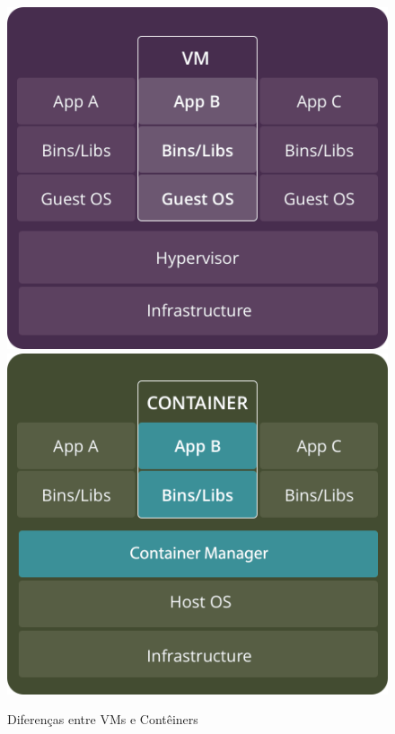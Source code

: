 \documentclass[]{politex}
\begin{document}
	\begin{figure}[htb]
		\caption{\label{fig_circulo}Diferenças entre VMs e Contêiners}
		\begin{center}
		\includegraphics[scale=0.20]{vms.png}
		\includegraphics[scale=0.20]{containers.png}
		\end{center}
	\end{figure}
	
\end{document}
